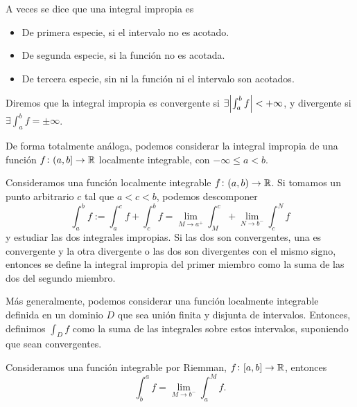 \begin{obs}
    A veces se dice que una integral impropia es
    \begin{itemize}
        \item De primera especie, si el intervalo no es acotado.
        \item De segunda especie, si la función no es acotada.
        \item De tercera especie, sin ni la función ni el intervalo son acotados.
    \end{itemize}
\end{obs}

\begin{defi}
    Diremos que la integral impropia es convergente si $\exists\abs{\int^b_a f}
    <+\infty$, y divergente si $\exists\int^b_a f = \pm\infty$.
\end{defi}

\begin{obs}
    De forma totalmente análoga, podemos considerar la integral impropia de una
    función $f \colon (a,b] \to \mathbb{R}$ localmente integrable, con $-\infty \leq a
    < b$.
\end{obs}

\begin{defi}
    Consideramos una función localmente integrable $f \colon (a,b) \to \mathbb{R}$. Si
    tomamos un punto arbitrario $c$ tal que $a < c < b$, podemos descomponer
    \[
        \int^b_a f := \int^c_a f + \int^b_c f = \lim_{M \to a^+} \int^c_M +
        \lim_{N \to b^-} \int^N_c f
    \]
    y estudiar las dos integrales impropias. Si las dos son convergentes, una
    es convergente y la otra divergente o las dos son divergentes con el mismo
    signo, entonces se define la integral impropia del primer miembro como la
    suma de las dos del segundo miembro.
\end{defi}
\begin{obs}
    Más generalmente, podemos considerar una función localmente integrable definida
    en un dominio $D$ que sea unión finita y disjunta de intervalos. Entonces,
    definimos $\int_D f$ como la suma de las integrales sobre estos intervalos,
    suponiendo que sean convergentes.
\end{obs}

\begin{prop}
    Consideramos una función integrable por Riemman, $f \colon [a,b] \to \mathbb{R}$,
    entonces
    \[
        \int^a_b f = \lim_{M \to b^-} \int^M_a f.
    \]
\end{prop}

